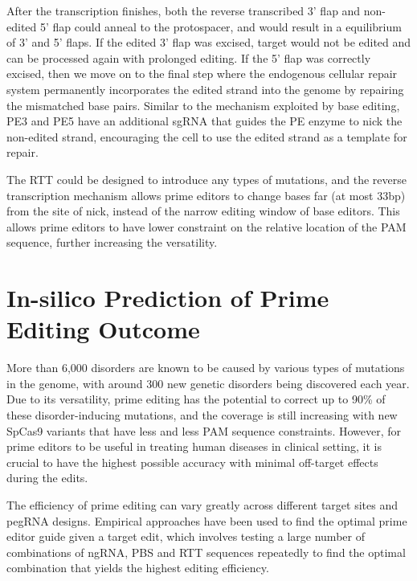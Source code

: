 After the transcription finishes, both the reverse transcribed 3' flap and non-edited 5' flap could anneal to the protospacer, and would result in a equilibrium of 3' and 5' flaps. If the edited 3' flap was excised, target would not be edited and can be processed again with prolonged editing. If the 5' flap was correctly excised, then we move on to the final step where the endogenous cellular repair system permanently incorporates the edited strand into the genome by repairing the mismatched base pairs. Similar to the mechanism exploited by base editing, PE3 and PE5 have an additional sgRNA that guides the PE enzyme to nick the non-edited strand, encouraging the cell to use the edited strand as a template for repair\cite{liudavidr.SearchandreplaceGenomeEditing2019}.

The RTT could be designed to introduce any types of mutations, and the reverse transcription mechanism allows prime editors to change bases far (at most 33bp) from the site of nick, instead of the narrow editing window of base editors. This allows prime editors to have lower constraint on the relative location of the PAM sequence, further increasing the versatility\cite{liuPrimeEditingPrecise2023}.

\section{In-silico Prediction of Prime Editing Outcome}

\label{sec:motivation}

More than 6,000 disorders are known to be caused by various types of mutations in the genome, with around 300 new genetic disorders being discovered each year\cite{petraityteGenomeEditingMedicine2021}. Due to its versatility, prime editing has the potential to correct up to 90\% of these disorder-inducing mutations\cite{kantorCRISPRCas9DNABaseEditing2020}, and the coverage is still increasing with new SpCas9 variants that have less and less PAM sequence constraints\cite{waltonUnconstrainedGenomeTargeting2020}. However, for prime editors to be useful in treating human diseases in clinical setting, it is crucial to have the highest possible accuracy with minimal off-target effects during the edits. 

The efficiency of prime editing can vary greatly across different target sites and pegRNA designs\cite{liudavidr.SearchandreplaceGenomeEditing2019}. Empirical approaches have been used to find the optimal prime editor guide given a target edit, which involves testing a large number of combinations of ngRNA, PBS and RTT sequences repeatedly to find the optimal combination that yields the highest editing efficiency.

